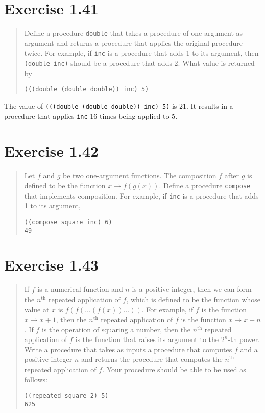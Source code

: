 \documentclass{article}
\begin{document}


\section{Exercise 1.41}
\begin{quote}
    Define a procedure \texttt{double} that takes a procedure of one argument
    as argument and returns a procedure that applies the original procedure
    twice. For example, if \texttt{inc} is a procedure that adds 1 to its
    argument, then \texttt{(double inc)} should be a procedure that adds 2.
    What value is returned by
    \begin{lstlisting}
(((double (double double)) inc) 5)
    \end{lstlisting}
\end{quote}



The value of \texttt{(((double (double double)) inc) 5)} is 21. It results in
a procedure that applies \texttt{inc} 16 times being applied to 5.

\section{Exercise 1.42}
\begin{quote}
    Let $f$ and $g$ be two one-argument functions. The composition $f$ after
    $g$ is defined to be the function $x\rightarrow f(g(x))$. Define a
    procedure \texttt{compose} that implements composition. For example, if
    \texttt{inc} is a procedure that adds 1 to its argument,
    \begin{lstlisting}
((compose square inc) 6)
49
    \end{lstlisting}
\end{quote}



\section{Exercise 1.43}
\begin{quote}
    If $f$ is a numerical function and $n$ is a positive integer, then we can
    form the $n^{\textrm{th}}$ repeated application of $f$, which is defined to
    be the function whose value at $x$ is $f(f(\ldots(f(x))\ldots))$. For
    example, if $f$ is the function $x\rightarrow x+1$, then the
    $n^{\textrm{th}}$ repeated application of $f$ is the function $x\rightarrow
    x+n$. If $f$ is the operation of squaring a number, then the
    $n^{\textrm{th}}$ repeated application of $f$ is the function that raises
    its argument to the $2^n$-th power. Write a procedure that takes as inputs
    a procedure that computes $f$ and a positive integer $n$ and returns the
    procedure that computes the $n^{\textrm{th}}$ repeated application of $f$.
    Your procedure should be able to be used as follows:
    \begin{lstlisting}
((repeated square 2) 5)
625
    \end{lstlisting}
\end{quote}
\end{document}
